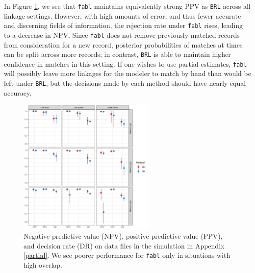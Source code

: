 \documentclass[ba]{imsart}
\begin{document}
In Figure \ref{fig:sadinle_simulation_partial}, we see that \texttt{fabl} maintains equivalently strong PPV as \texttt{BRL} across all linkage settings. However, with high amounts of error, and thus fewer accurate and discerning fields of information, the rejection rate under \texttt{fabl} rises, leading to a decrease in NPV. Since \texttt{fabl} does not remove previously matched records from consideration for a new record, posterior probabilities of matches at times can be split across more records; in contrast, \texttt{BRL} is able to maintain higher confidence in matches in this setting. If one wishes to use partial estimates, \texttt{fabl} will possibly leave more linkages for the modeler to match by hand than would be left under \texttt{BRL}, but the decisions made by each method should have nearly equal accuracy. 



\begin{figure}[t]
	\begin{center}
		\includegraphics[width=0.6\textwidth]{../notes/figures/sadinle_sim_plot_partial_DR} 
		\caption{Negative predictive value (NPV), positive predictive value (PPV), and decision rate (DR) on data files in the simulation in Appendix \ref{partial}. We see poorer performance for \texttt{fabl} only in situations with high overlap.}
		\label{fig:sadinle_simulation_partial}
	\end{center}
\end{figure}
	
\end{document}
